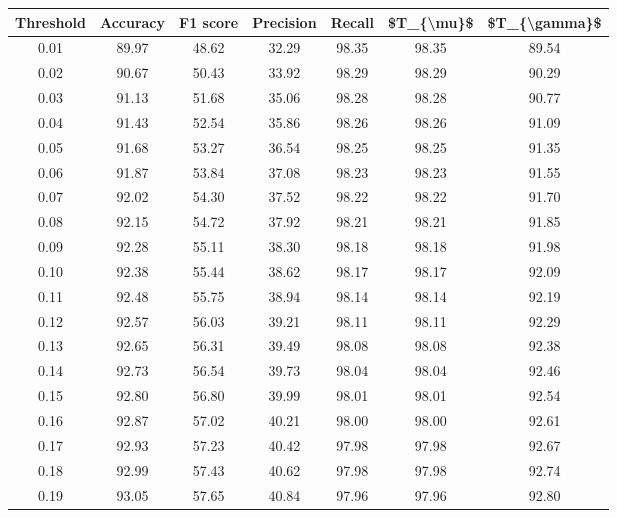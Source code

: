\begin{tabular}{|c|c|c|c|c|c|c|}
\hline
 Threshold &  Accuracy &  F1 score &  Precision &  Recall &  \$T\_\{\textbackslash mu\}\$ &  \$T\_\{\textbackslash gamma\}\$ \\
\hline
      0.01 &     89.97 &     48.62 &      32.29 &   98.35 &      98.35 &         89.54 \\
      0.02 &     90.67 &     50.43 &      33.92 &   98.29 &      98.29 &         90.29 \\
      0.03 &     91.13 &     51.68 &      35.06 &   98.28 &      98.28 &         90.77 \\
      0.04 &     91.43 &     52.54 &      35.86 &   98.26 &      98.26 &         91.09 \\
      0.05 &     91.68 &     53.27 &      36.54 &   98.25 &      98.25 &         91.35 \\
      0.06 &     91.87 &     53.84 &      37.08 &   98.23 &      98.23 &         91.55 \\
      0.07 &     92.02 &     54.30 &      37.52 &   98.22 &      98.22 &         91.70 \\
      0.08 &     92.15 &     54.72 &      37.92 &   98.21 &      98.21 &         91.85 \\
      0.09 &     92.28 &     55.11 &      38.30 &   98.18 &      98.18 &         91.98 \\
      0.10 &     92.38 &     55.44 &      38.62 &   98.17 &      98.17 &         92.09 \\
      0.11 &     92.48 &     55.75 &      38.94 &   98.14 &      98.14 &         92.19 \\
      0.12 &     92.57 &     56.03 &      39.21 &   98.11 &      98.11 &         92.29 \\
      0.13 &     92.65 &     56.31 &      39.49 &   98.08 &      98.08 &         92.38 \\
      0.14 &     92.73 &     56.54 &      39.73 &   98.04 &      98.04 &         92.46 \\
      0.15 &     92.80 &     56.80 &      39.99 &   98.01 &      98.01 &         92.54 \\
      0.16 &     92.87 &     57.02 &      40.21 &   98.00 &      98.00 &         92.61 \\
      0.17 &     92.93 &     57.23 &      40.42 &   97.98 &      97.98 &         92.67 \\
      0.18 &     92.99 &     57.43 &      40.62 &   97.98 &      97.98 &         92.74 \\
      0.19 &     93.05 &     57.65 &      40.84 &   97.96 &      97.96 &         92.80 \\

\end{tabular}
